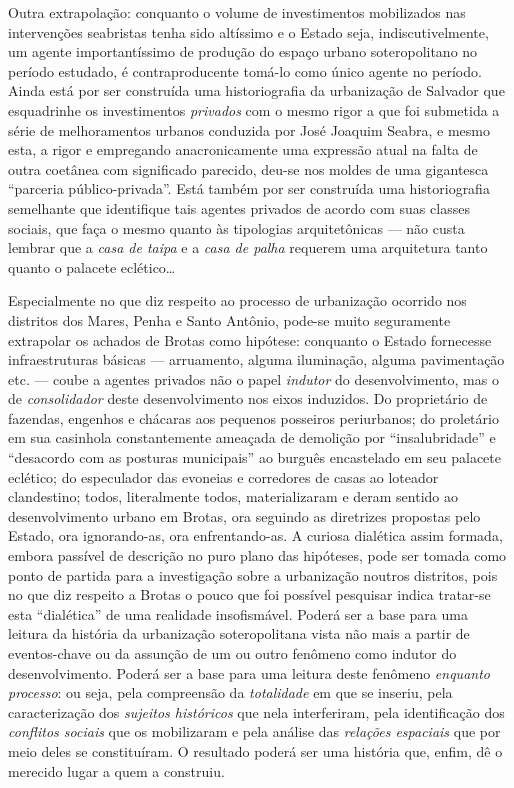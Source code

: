 Outra extrapolação: conquanto o volume de investimentos mobilizados nas intervenções seabristas tenha sido altíssimo e o Estado seja, indiscutivelmente, um agente importantíssimo de produção do espaço urbano soteropolitano no período estudado, é contraproducente tomá-lo como único agente no período. Ainda está por ser construída uma historiografia da urbanização de Salvador que esquadrinhe os investimentos \textit{privados} com o mesmo rigor a que foi submetida a série de melhoramentos urbanos conduzida por José Joaquim Seabra, e mesmo esta, a rigor e empregando anacronicamente uma expressão atual na falta de outra coetânea com significado parecido, deu-se nos moldes de uma gigantesca ``parceria público-privada''. Está também por ser construída uma historiografia semelhante que identifique tais agentes privados de acordo com suas classes sociais, que faça o mesmo quanto às tipologias arquitetônicas --- não custa lembrar que a \textit{casa de taipa} e a \textit{casa de palha} requerem uma arquitetura tanto quanto o palacete eclético\dots

Especialmente no que diz respeito ao processo de urbanização ocorrido nos distritos dos Mares, Penha e Santo Antônio, pode-se muito seguramente extrapolar os achados de Brotas como hipótese: conquanto o Estado fornecesse infraestruturas básicas --- arruamento, alguma iluminação, alguma pavimentação etc. --- coube a agentes privados não o papel \textit{indutor} do desenvolvimento, mas o de \textit{consolidador} deste desenvolvimento nos eixos induzidos. Do proprietário de fazendas, engenhos e chácaras aos pequenos posseiros periurbanos; do proletário em sua casinhola constantemente ameaçada de demolição por ``insalubridade'' e ``desacordo com as posturas municipais'' ao burguês encastelado em seu palacete eclético; do especulador das evoneias e corredores de casas ao loteador clandestino; todos, literalmente todos, materializaram e deram sentido ao desenvolvimento urbano em Brotas, ora seguindo as diretrizes propostas pelo Estado, ora ignorando-as, ora enfrentando-as. A curiosa dialética assim formada, embora passível de descrição no puro plano das hipóteses, pode ser tomada como ponto de partida para a investigação sobre a urbanização noutros distritos, pois no que diz respeito a Brotas o pouco que foi possível pesquisar indica tratar-se esta ``dialética'' de uma realidade insofismável. Poderá ser a base para uma leitura da história da urbanização soteropolitana vista não mais a partir de eventos-chave ou da assunção de um ou outro fenômeno como indutor do desenvolvimento. Poderá ser a base para uma leitura deste fenômeno \textit{enquanto processo}: ou seja, pela compreensão da \textit{totalidade} em que se inseriu, pela caracterização dos \textit{sujeitos históricos} que nela interferiram, pela identificação dos \textit{conflitos sociais} que os mobilizaram e pela análise das \textit{relações espaciais} que por meio deles se constituíram. O resultado poderá ser uma história que, enfim, dê o merecido lugar a quem a construiu.